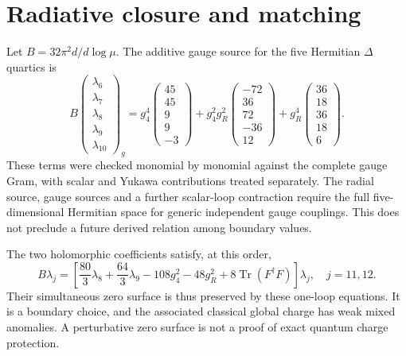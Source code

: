 \documentclass[11pt]{article}
\newcommand{\Tr}{\operatorname{Tr}}
\begin{document}
\section{Radiative closure and matching}
Let $B=32\pi^2d/d\log\mu$. The additive gauge source for the five
Hermitian $\Delta$ quartics is
\begin{equation}
 B\begin{pmatrix}\lambda_6\\\lambda_7\\\lambda_8\\\lambda_9\\\lambda_{10}\end{pmatrix}_{\!g}
 =g_4^4\begin{pmatrix}45\\45\\9\\9\\-3\end{pmatrix}
 +g_4^2g_R^2\begin{pmatrix}-72\\36\\72\\-36\\12\end{pmatrix}
 +g_R^4\begin{pmatrix}36\\18\\36\\18\\6\end{pmatrix}.
\end{equation}
These terms were checked monomial by monomial against the complete gauge
Gram, with scalar and Yukawa contributions treated separately. The radial
source, gauge sources and a further scalar-loop contraction require the
full five-dimensional Hermitian space for generic independent gauge couplings.
This does not preclude a future derived relation among boundary values.

The two holomorphic coefficients satisfy, at this order,
\begin{equation}
 B\lambda_j=\left[\frac{80}{3}\lambda_8+\frac{64}{3}\lambda_9
 -108g_4^2-48g_R^2+8\Tr(F^\dagger F)\right]\lambda_j,
 \quad j=11,12.
\end{equation}
Their simultaneous zero surface is thus preserved by these one-loop
equations. It is a boundary choice, and the associated classical global
charge has weak mixed anomalies. A perturbative zero surface is not a proof
of exact quantum charge protection.
\end{document}
